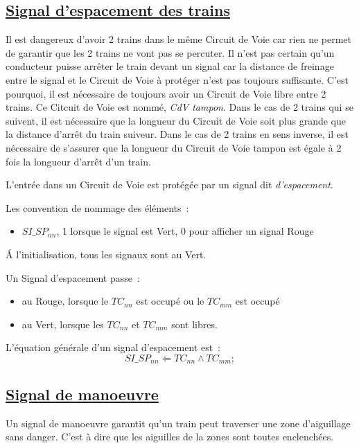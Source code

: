 \subsection{\underline{Signal d'espacement des trains}}
\label{sec:esp}

Il est dangereux d'avoir 2 trains dans le même Circuit de Voie car
rien ne permet de garantir que les 2 trains ne vont pas se
percuter. Il n'est pas certain qu'un conducteur puisse arrêter le
train devant un signal car la distance de freinage entre le signal et
le Circuit de Voie à protéger n'est pas toujours suffisante. C'est
pourquoi, il est nécessaire de toujours avoir un Circuit de Voie libre
entre 2 trains. Ce Citcuit de Voie est nommé, \emph{CdV tampon}.  Dans
le cas de 2 trains qui se suivent, il est nécessaire que la longueur
du Circuit de Voie soit plus grande que la distance d'arrêt du train
suiveur.  Dans le cas de 2 trains en sens inverse, il est nécessaire
de s'assurer que la longueur du Circuit de Voie tampon est égale à 2
fois la longueur d'arrêt d'un train.

L'entrée dans un Circuit de Voie est protégée par un signal dit
\emph{d'espacement}.

Les convention de nommage des éléments~:
\begin{itemize}
\item $SI\_SP_{nn}$, 1 lorsque le signal est Vert, 0 pour afficher un
  signal Rouge
\end{itemize}

\'A l'initialisation, tous les signaux sont au Vert.

Un Signal d'espacement passe~:
\begin{itemize}
\item au Rouge, lorsque le $TC_{nn}$ est occupé ou le $TC_{mm}$ est occupé
\item au Vert, lorsque les $TC_{nn}$ et $TC_{mm}$ sont libres.
\end{itemize}

\medskip
L'équation générale d'un signal d'espacement est~:
$$\boxed{
  SI\_SP_{nn} \Leftarrow TC_{nn} \land TC_{mm};
}$$


\subsection{\underline{Signal de manoeuvre}}
\label{sec:esp}

Un signal de manoeuvre garantit qu'un train peut traverser une zone
d'aiguillage sans danger. C'est à dire que les aiguilles de la zones
sont toutes enclenchées.




